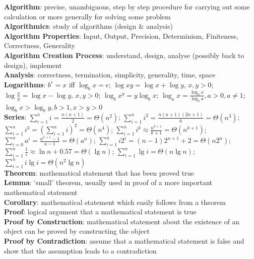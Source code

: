 \documentclass[a4paper]{article}
\begin{document}
    \begin{multicols}{2}
        \scriptsize
        \noindent\textbf{Algorithm}: precise, unambiguous, step by step procedure for carrying out some calculation or more generally for solving some problem\\
        \textbf{Algorithmics}: study of algorithms (design \& analysis)\\
        \textbf{Algorithm Properties}: Input, Output, Precision, Determinism, Finiteness, Correctness, Generality\\
        \textbf{Algorithm Creation Process}: understand, design, analyse (possibly back to design), implement\\
        \textbf{Analysis}: correctness, termination, simplicity, generality, time, space\\
        \textbf{Logarithms}: $b^e = x$ iff $\log_b x = e$; $\log xy = \log x + \log y$, $x, y > 0$; $\log \frac{x}{y} = \log x - \log y$, $x, y > 0$; $\log_b x^y = y \log_b x$; $\log_a x = \frac{\log_b x}{\log_b a}, a > 0, a \neq 1$; $\log_b x > \log_b y, b > 1, x > y > 0$\\
        \textbf{Series}: $\sum\nolimits_{i=1}^n i = \frac{n(n+1)}{2} = \Theta (n^2)$; $\sum\nolimits_{i=1}^n i^2 = \frac{n(n+1)(2n+1)}{6} = \Theta (n^3)$; $\sum\nolimits_{i=1}^n i^3 = {(\sum\nolimits_{i=1}^n i)}^2 = \Theta (n^4)$; $\sum\nolimits_{i=1}^n i^k \approx \frac{n^{k+1}}{k+1} = \Theta (n^{k+1})$; $\sum\nolimits_{i=0}^n a^i = \frac{a^{n+1}-1}{a-1} = \Theta (a^n)$; $\sum\nolimits_{i=1}^n i2^i = (n-1)2^{n+1}+2 = \Theta (n2^n)$; $\sum\nolimits_{i=1}^n \frac{1}{i} \approx \ln n + 0.57 = \Theta (\lg n)$; $\sum\nolimits_{i=1}^n \lg i = \Theta (n \lg n)$; $\sum\nolimits_{i=1}^n i \lg i = \Theta (n^2 \lg n)$\\
        \textbf{Theorem}: mathematical statement that has been proved true\\
        \textbf{Lemma}: `small' theorem, usually used in proof of a more important mathematical statement\\
        \textbf{Corollary}: mathematical statement which easily follows from a theorem\\
        \textbf{Proof}: logical argument that a mathematical statement is true\\
        \textbf{Proof by Construction}: mathematical statement about the existence of an object can be proved by constructing the object\\
        \textbf{Proof by Contradiction}: assume that a mathematical statement is false and show that the assumption leads to a contradiction\\

\end{multicols}
\end{document}
